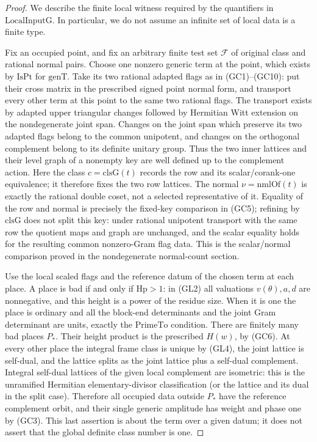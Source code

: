 \begin{proof}
We describe the finite local witness required by the quantifiers
in \(\mathrm{LocalInputG}\). In particular, we do not assume
an infinite set of local data is a finite type.

Fix an occupied point, and fix an arbitrary finite test set
\(\mathcal F\) of original class and rational normal pairs.
Choose one nonzero generic term at the point, which exists
by \(\mathrm{IsPt}\) for \(\mathrm{genT}\).
Take its two rational adapted flags as in (GC1)--(GC10):
put their cross matrix in the prescribed signed point
normal form, and transport every other term at this point
to the same two rational flags. The transport exists by
adapted upper triangular changes followed by Hermitian
Witt extension on the nondegenerate joint span.
Changes on the joint span which preserve its two adapted
flags belong to the common unipotent, and changes on the
orthogonal complement belong to its definite unitary group.
Thus the two inner lattices and their level graph of a
nonempty key are well defined up to the complement action.
Here the class \(c=\mathrm{clsG}(t)\) records the row and its
scalar/corank-one equivalence; it therefore fixes the two
row lattices. The normal \(\nu=\mathrm{nmlOf}(t)\) is
exactly the rational double coset, not a selected
representative of it. Equality of the row and normal
is precisely the fixed-key comparison in (GC5);
refining by \(\mathrm{clsG}\) does not split this
key: under rational unipotent transport with the same
row the quotient maps and graph are unchanged, and
the scalar equality holds for the resulting common
nonzero-Gram flag data. This is the scalar/normal
comparison proved in the nondegenerate normal-count
section.

Use the local scaled flags and the reference datum of the
chosen term at each place. A place is bad if and only if
\(\mathrm{Hp}>1\): in (GL2) all valuations
\(v(\theta),a,d\) are nonnegative, and this height is a
power of the residue size. When it is one the place is
ordinary and all the block-end determinants and the
joint Gram determinant are units, exactly the
\(\mathrm{PrimeTo}\) condition. There are finitely many
bad places \(P_*\). Their height product is the prescribed
\(H(w)\), by (GC6). At every other place the integral
frame class is unique by (GL4), the joint lattice is
self-dual, and the lattice splits as the joint lattice
plus a self-dual complement. Integral self-dual lattices
of the given local complement are isometric: this is
the unramified Hermitian elementary-divisor classification
(or the lattice and its dual in the split case). Therefore
all occupied data outside \(P_*\) have the reference
complement orbit, and their single generic amplitude
has weight and phase one by (GC3). This last assertion
is about the term over a given datum; it does not assert
that the global definite class number is one.


\end{proof}
